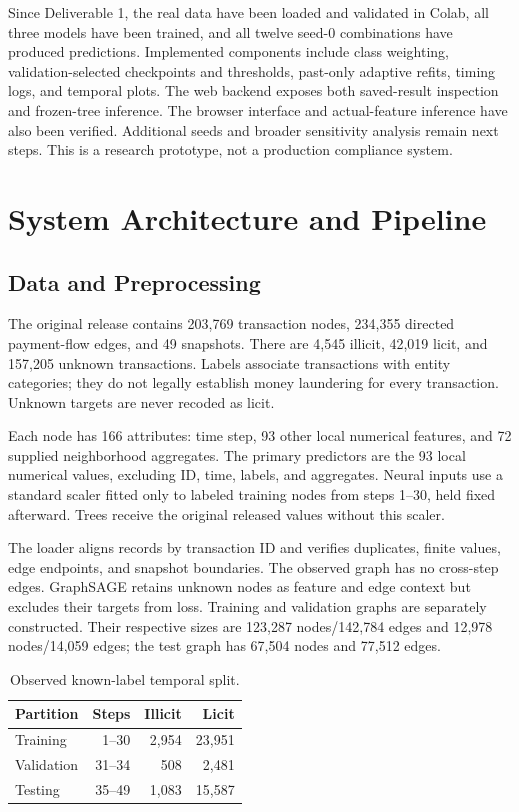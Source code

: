 \documentclass[conference]{IEEEtran}
\begin{document}
Since Deliverable 1, the real data have been loaded and validated in Colab, all three models have been trained, and all twelve seed-0 combinations have produced predictions. Implemented components include class weighting, validation-selected checkpoints and thresholds, past-only adaptive refits, timing logs, and temporal plots. The web backend exposes both saved-result inspection and frozen-tree inference. The browser interface and actual-feature inference have also been verified. Additional seeds and broader sensitivity analysis remain next steps. This is a research prototype, not a production compliance system.

\section{System Architecture and Pipeline}
\subsection{Data and Preprocessing}
The original release \cite{dataset} contains 203,769 transaction nodes, 234,355 directed payment-flow edges, and 49 snapshots. There are 4,545 illicit, 42,019 licit, and 157,205 unknown transactions. Labels associate transactions with entity categories; they do not legally establish money laundering for every transaction. Unknown targets are never recoded as licit.

Each node has 166 attributes: time step, 93 other local numerical features, and 72 supplied neighborhood aggregates. The primary predictors are the 93 local numerical values, excluding ID, time, labels, and aggregates. Neural inputs use a standard scaler fitted only to labeled training nodes from steps 1--30, held fixed afterward. Trees receive the original released values without this scaler.

The loader aligns records by transaction ID and verifies duplicates, finite values, edge endpoints, and snapshot boundaries. The observed graph has no cross-step edges. GraphSAGE retains unknown nodes as feature and edge context but excludes their targets from loss. Training and validation graphs are separately constructed. Their respective sizes are 123,287 nodes/142,784 edges and 12,978 nodes/14,059 edges; the test graph has 67,504 nodes and 77,512 edges.

\begin{table}[t]\caption{Observed known-label temporal split.}\centering\small
\begin{tabular}{lrrr}\toprule
Partition & Steps & Illicit & Licit\\\midrule
Training & 1--30 & 2,954 & 23,951\\
Validation & 31--34 & 508 & 2,481\\
Testing & 35--49 & 1,083 & 15,587\\\bottomrule
\end{tabular}\label{tab:split}\end{table}
\end{document}
